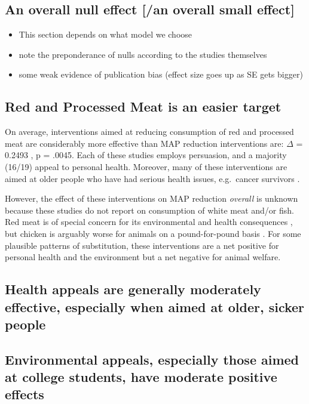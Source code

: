 \documentclass[sn-nature,pdflatex]{sn-jnl}
\providecommand{\tightlist}{%
  \setlength{\itemsep}{0pt}\setlength{\parskip}{0pt}}
\begin{document}
\subsection{An overall null effect {[}/an overall small
effect{]}}\label{an-overall-null-effect-an-overall-small-effect}

\begin{itemize}
\tightlist
\item
  This section depends on what model we choose
\item
  note the preponderance of nulls according to the studies themselves
\item
  some weak evidence of publication bias (effect size goes up as SE gets
  bigger)
\end{itemize}

\subsection{Red and Processed Meat is an easier
target}\label{red-and-processed-meat-is-an-easier-target}

On average, interventions aimed at reducing consumption of red and
processed meat are considerably more effective than MAP reduction
interventions are: \(\Delta\) = 0.2493 , p = .0045.
Each of these studies employs persuasion, and a majority (16/19) appeal
to personal health. Moreover, many of these interventions are aimed at
older people who have had serious health issues, e.g.~cancer survivors
\citep{lee2018, james2015}.

However, the effect of these interventions on MAP reduction
\emph{overall} is unknown because these studies do not report on
consumption of white meat and/or fish. Red meat is of special concern
for its environmental and health consequences \citep{grummon2023}, but
chicken is arguably worse for animals on a pound-for-pound basis
\citep{mathur2022}. For some plausible patterns of substitution, these
interventions are a net positive for personal health and the environment
but a net negative for animal welfare.

\subsection{Health appeals are generally moderately effective,
especially when aimed at older, sicker
people}\label{health-appeals-are-generally-moderately-effective-especially-when-aimed-at-older-sicker-people}

\subsection{Environmental appeals, especially those aimed at college
students, have moderate positive
effects}\label{environmental-appeals-especially-those-aimed-at-college-students-have-moderate-positive-effects}
\end{document}
